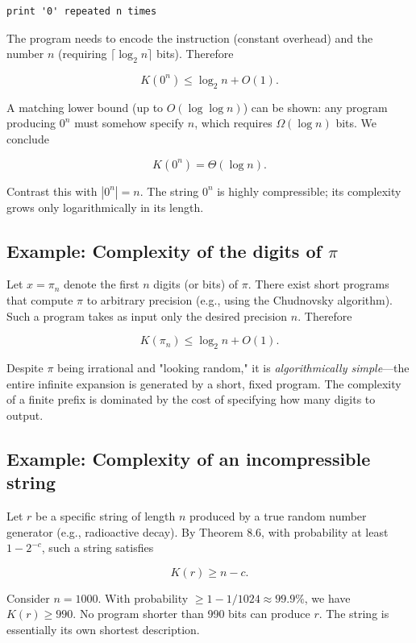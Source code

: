 \begin{verbatim}
print '0' repeated n times
\end{verbatim}

The program needs to encode the instruction (constant overhead) and the number $n$ (requiring $\lceil \log_2 n \rceil$ bits). Therefore

\[K(0^n) \leq \log_2 n + O(1).\]

A matching lower bound (up to $O(\log \log n)$) can be shown: any program producing $0^n$ must somehow specify $n$, which requires $\Omega(\log n)$ bits. We conclude

\[K(0^n) = \Theta(\log n).\]

Contrast this with $|0^n| = n$. The string $0^n$ is highly compressible; its complexity grows only logarithmically in its length.

\subsection*{Example: Complexity of the digits of $\pi$}

Let $x = \pi_n$ denote the first $n$ digits (or bits) of $\pi$. There exist short programs that compute $\pi$ to arbitrary precision (e.g., using the Chudnovsky algorithm). Such a program takes as input only the desired precision $n$. Therefore

\[K(\pi_n) \leq \log_2 n + O(1).\]

Despite $\pi$ being irrational and "looking random," it is \textit{algorithmically simple}—the entire infinite expansion is generated by a short, fixed program. The complexity of a finite prefix is dominated by the cost of specifying how many digits to output.

\subsection*{Example: Complexity of an incompressible string}

Let $r$ be a specific string of length $n$ produced by a true random number generator (e.g., radioactive decay). By Theorem 8.6, with probability at least $1 - 2^{-c}$, such a string satisfies

\[K(r) \geq n - c.\]

Consider $n = 1000$. With probability $\geq 1 - 1/1024 \approx 99.9\%$, we have $K(r) \geq 990$. No program shorter than 990 bits can produce $r$. The string is essentially its own shortest description.

